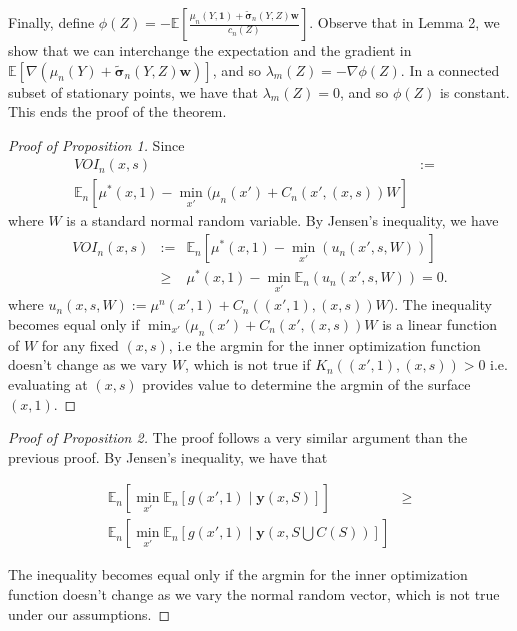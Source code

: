 \documentclass[letterpaper]{article}
\newcommand{\E}{\mathbb{E}}
\newcommand{\cost}{c}
\newcommand{\Y}{\mathbf{y}}
\renewcommand{\S}{S}
\newcommand{\w}{\mathbf{w}}
\newcommand{\sigmatilde}{\tilde{\mathbf{\sigma}}}
\newcommand{\one}{\mathbf{1}}
\theoremstyle{definition}
\numberwithin{equation}{section}
\begin{document}
Finally, define $\phi\left(Z\right)=-\E\left[\frac{\mu_{n}\left(Y,\one\right)+\sigmatilde_{n}\left(Y,Z\right)\w}{\cost_n\left(Z\right)}\right]$.
Observe that in Lemma 2, we show that we can interchange the expectation
and the gradient in $\E\left[\nabla\left(\mu_{n}\left(Y\right)+\sigmatilde_{n}\left(Y,Z\right)\w\right)\right]$,
and so $\lambda_{m}\left(Z\right)=-\nabla\phi\left(Z\right).$ In
a connected subset of stationary points, we have that $\lambda_{m}\left(Z\right)=0$,
and so $\phi\left(Z\right)$ is constant. This ends the proof of the
theorem.
\endproof

\begin{proof}[Proof of Proposition 1]
Since
\begin{eqnarray*}
VOI_{n}(x, s) &:=& \\
\E_n[\mu^*(x, 1) - \min_{x'} (\mu_n(x') + C_{n}(x', (x, s)) W]
\end{eqnarray*}
where $W$ is a standard normal random variable. By Jensen's inequality, we have
\begin{eqnarray*}
VOI_{n}(x, s) &:=& \E_n[\mu^*(x, 1) - \min_{x'} (u_{n}\left(x',s,W\right))]\\
&\ge& \mu^*(x, 1) - \min_{x'} \E_n(u_{n}\left(x',s,W\right)) = 0.
\end{eqnarray*}
where $u_{n}\left(x,s,W\right):=\mu^n(x', 1) + C_{n}((x', 1), (x, s)) W)$.
The inequality becomes equal only if $\min_{x'} (\mu_n(x') + C_{n}(x', (x, s)) W$ is a linear function of $W$ for any fixed $(x, s)$, i.e the argmin for the inner optimization function doesn't change as we vary $W$, which is not true if $K_{n}((x', 1), (x, s))>0$ i.e. evaluating at $(x, s)$ provides value to determine the argmin of the surface $(x, 1)$.
\end{proof}

\begin{proof}[Proof of Proposition 2]
The proof follows a very similar argument than the previous proof. By Jensen's inequality, we have that

\begin{eqnarray*}
\E_{n}\left[\min_{x'}\E_{n}\left[g(x',1)\mid\Y(x,\S)\right]\right] & \geq\\
\E_{n}\left[\min_{x'}\E_{n}\left[g(x',1)\mid\Y(x,\S\bigcup C(\S))\right]\right]
\end{eqnarray*}

The inequality becomes equal only if the argmin for the inner optimization function doesn't change as we vary the normal random vector, which is not true under our assumptions.


\end{proof}
\end{document}
